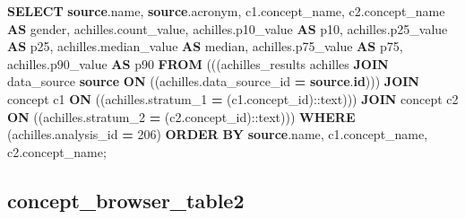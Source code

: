 \documentclass[
]{book}
\newenvironment{Shaded}{\begin{snugshade}}{\end{snugshade}}
\newcommand{\CharTok}[1]{\textcolor[rgb]{0.31,0.60,0.02}{#1}}
\newcommand{\DecValTok}[1]{\textcolor[rgb]{0.00,0.00,0.81}{#1}}
\newcommand{\FunctionTok}[1]{\textcolor[rgb]{0.00,0.00,0.00}{#1}}
\newcommand{\KeywordTok}[1]{\textcolor[rgb]{0.13,0.29,0.53}{\textbf{#1}}}
\newcommand{\NormalTok}[1]{#1}
\newcommand{\OperatorTok}[1]{\textcolor[rgb]{0.81,0.36,0.00}{\textbf{#1}}}
\begin{document}
\begin{Shaded}
\begin{Highlighting}[]
\KeywordTok{SELECT} \KeywordTok{source}\NormalTok{.name,}
   \KeywordTok{source}\NormalTok{.acronym,}
\NormalTok{   c1.concept\_name,}
\NormalTok{   c2.concept\_name }\KeywordTok{AS}\NormalTok{ gender,}
\NormalTok{   achilles.count\_value,}
\NormalTok{   achilles.p10\_value }\KeywordTok{AS}\NormalTok{ p10,}
\NormalTok{   achilles.p25\_value }\KeywordTok{AS}\NormalTok{ p25,}
\NormalTok{   achilles.median\_value }\KeywordTok{AS} \FunctionTok{median}\NormalTok{,}
\NormalTok{   achilles.p75\_value }\KeywordTok{AS}\NormalTok{ p75,}
\NormalTok{   achilles.p90\_value }\KeywordTok{AS}\NormalTok{ p90}
  \KeywordTok{FROM}\NormalTok{ (((achilles\_results achilles}
    \KeywordTok{JOIN}\NormalTok{ data\_source }\KeywordTok{source} \KeywordTok{ON}\NormalTok{ ((achilles.data\_source\_id }\OperatorTok{=} \KeywordTok{source}\NormalTok{.}\KeywordTok{id}\NormalTok{)))}
    \KeywordTok{JOIN}\NormalTok{ concept c1 }\KeywordTok{ON}\NormalTok{ ((achilles.stratum\_1 }\OperatorTok{=}\NormalTok{ (c1.concept\_id):}\CharTok{:text}\NormalTok{)))}
    \KeywordTok{JOIN}\NormalTok{ concept c2 }\KeywordTok{ON}\NormalTok{ ((achilles.stratum\_2 }\OperatorTok{=}\NormalTok{ (c2.concept\_id):}\CharTok{:text}\NormalTok{)))}
 \KeywordTok{WHERE}\NormalTok{ (achilles.analysis\_id }\OperatorTok{=} \DecValTok{206}\NormalTok{)}
 \KeywordTok{ORDER} \KeywordTok{BY} \KeywordTok{source}\NormalTok{.name, c1.concept\_name, c2.concept\_name;}
\end{Highlighting}
\end{Shaded}

\hypertarget{concept_browser_table2}{%
\subsection*{concept\_browser\_table2}\label{concept_browser_table2}}
\end{document}
